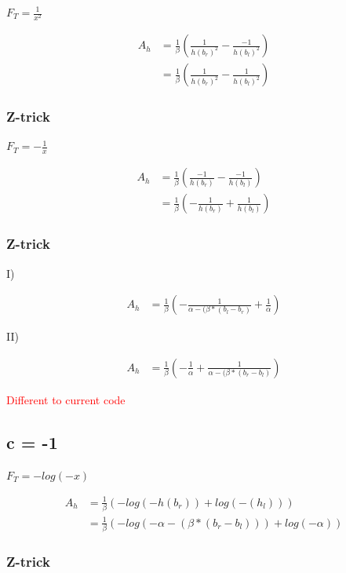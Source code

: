 \documentclass[]{article}
\begin{document}
$F_T = \frac{1}{x^2}$

\begin{align*}
A_h &= \frac{1}{\beta} \left(\frac{1}{h(b_r)^2} - \frac{-1}{h(b_l)^2} \right) \\
& = \frac{1}{\beta} \left(\frac{1}{h(b_r)^2} - \frac{1}{h(b_l)^2} \right)
\end{align*}

\subsubsection{Z-trick}


$F_T = - \frac{1}{x}$

\begin{align*}
A_h &= \frac{1}{\beta} \left(\frac{-1}{h(b_r)} - \frac{-1}{h(b_l)} \right) \\
& = \frac{1}{\beta} \left(- \frac{1}{h(b_r)} + \frac{1}{h(b_l)} \right)
\end{align*}

\subsubsection{Z-trick}

I)

\begin{align*}
A_h & = \frac{1}{\beta} \left(- \frac{1}{\alpha - (\beta * (b_l - b_r)} + \frac{1}{\alpha} \right)
\end{align*}

II)

\begin{align*}
A_h & = \frac{1}{\beta} \left(- \frac{1}{\alpha} + \frac{1}{\alpha - (\beta * (b_r - b_l)} \right)
\end{align*}

\textcolor{red}{Different to current code}

\subsection{c = -1}

$F_T = - log(-x)$

\begin{align*}
A_h &= \frac{1}{\beta} \left(-log(-h(b_r)) + log(-(h_l)) \right) \\
&= \frac{1}{\beta} \left(-log(-\alpha - (\beta * (b_r - b_l))) + log(-\alpha) \right)
\end{align*}

\subsubsection{Z-trick}
\end{document}
